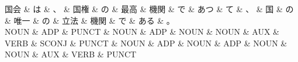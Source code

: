 \documentclass[tikz,border=5pt]{standalone}
\begin{document}
\normalsize
\begin{dependency}[edge unit distance=12.0pt]
    \begin{deptext}[column sep=1em]
        国会 \& は \& 、 \& 国権 \& の \& 最高 \& 機関 \& で \& あつ \& て \& 、 \& 国 \& の \& 唯一 \& の \& 立法 \& 機関 \& で \& ある \& 。\\
        NOUN \& ADP \& PUNCT \& NOUN \& ADP \& NOUN \& NOUN \& AUX \& VERB \& SCONJ \& PUNCT \& NOUN \& ADP \& NOUN \& ADP \& NOUN \& NOUN \& AUX \& VERB \& PUNCT\\
    \end{deptext}
\end{dependency}
\end{document}
